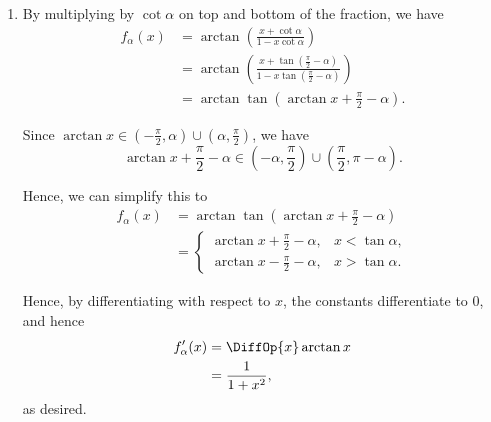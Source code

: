 \Question{\currfilebase}
\begin{enumerate}
    \item By multiplying by \(\cot \alpha\) on top and bottom of the fraction, we have
          \begin{align*}
              f_{\alpha}(x) & = \arctan \left(\frac{x + \cot \alpha}{1 - x \cot \alpha}\right)                                                           \\
                            & = \arctan \left(\frac{x + \tan \left(\frac{\pi}{2} - \alpha\right)}{1 - x \tan \left(\frac{\pi}{2} - \alpha\right)}\right) \\
                            & = \arctan \tan \left(\arctan x + \frac{\pi}{2} - \alpha\right).
          \end{align*}

          Since \(\arctan x \in \left(-\frac{\pi}{2}, \alpha\right) \cup \left(\alpha, \frac{\pi}{2}\right)\), we have
          \[
              \arctan x + \frac{\pi}{2} - \alpha \in \left(-\alpha, \frac{\pi}{2}\right) \cup \left(\frac{\pi}{2}, \pi - \alpha\right).
          \]

          Hence, we can simplify this to
          \begin{align*}
              f_{\alpha}(x) & = \arctan \tan \left(\arctan x + \frac{\pi}{2} - \alpha\right) \\
                            & = \begin{cases}
                                    \arctan x + \frac{\pi}{2} - \alpha, & x < \tan \alpha, \\
                                    \arctan x - \frac{\pi}{2} - \alpha, & x > \tan \alpha.
                                \end{cases}
          \end{align*}

          Hence, by differentiating with respect to \(x\), the constants differentiate to \(0\), and hence
          \begin{align*}
              f'_{\alpha}(x) & = \DiffOp{x} \arctan x \\
                             & = \frac{1}{1 + x^2},
          \end{align*}
          as desired.


\end{enumerate}
